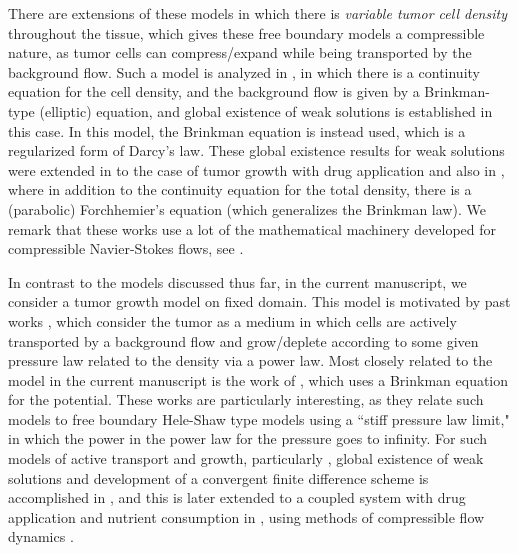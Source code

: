 \documentclass[12pt]{article}
\theoremstyle{plain}
\begin{document}
There are extensions of these models in which there is \textit{variable tumor cell density} throughout the tissue, which gives these free boundary models a compressible nature, as tumor cells can compress/expand while being transported by the background flow. Such a model is analyzed in \cite{DonatelliTrivisa}, in which there is a continuity equation for the cell density, and the background flow is given by a Brinkman-type (elliptic) equation, and global existence of weak solutions is established in this case. In this model, the Brinkman equation is instead used, which is a regularized form of Darcy's law. These global existence results for weak solutions were extended in \cite{DonatelliTrivisa3} to the case of tumor growth with drug application and also in \cite{DonatelliTrivisa2}, where in addition to the continuity equation for the total density, there is a (parabolic) Forchhemier's equation (which generalizes the Brinkman law). We remark that these works use a lot of the mathematical machinery developed for compressible Navier-Stokes flows, see \cite{FeireislCompressible, LionsBook}.

In contrast to the models discussed thus far, in the current manuscript, we consider a tumor growth model on fixed domain. This model is motivated by past works \cite{Perthame2, Perthame3, Perthame4, Perthame1}, which consider the tumor as a medium in which cells are actively transported by a background flow and grow/deplete according to some given pressure law related to the density via a power law. Most closely related to the model in the current manuscript is the work of \cite{Perthame4}, which uses a Brinkman equation for the potential. These works \cite{Perthame2, Perthame3, Perthame4, Perthame1} are particularly interesting, as they relate such models to free boundary Hele-Shaw type models using a ``stiff pressure law limit," in which the power in the power law for the pressure goes to infinity. For such models of active transport and growth, particularly \cite{Perthame4}, global existence of weak solutions and development of a convergent finite difference scheme is accomplished in \cite{WeberTrivisa}, and this is later extended to a coupled system with drug application and nutrient consumption in \cite{TrivisaWeberDrug}, using methods of compressible flow dynamics \cite{FeireislCompressible, LionsBook}. 
\end{document}
